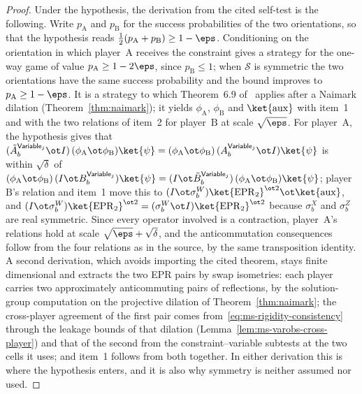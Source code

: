 \begin{proof}
	Under the hypothesis, the derivation from the cited self-test is the following. Write $p_{\mathrm A}$ and $p_{\mathrm B}$ for the success probabilities of the two orientations, so that the hypothesis reads $\tfrac12(p_{\mathrm A} + p_{\mathrm B}) \ge 1-\eps$. Conditioning on the orientation in which player~$\mathrm A$ receives the constraint gives a strategy for the one-way game of value $p_{\mathrm A} \ge 1-2\eps$, since $p_{\mathrm B} \le 1$; when $\mathcal S$ is symmetric the two orientations have the same success probability and the bound improves to $p_{\mathrm A} \ge 1-\eps$. It is a strategy to which Theorem~6.9 of~\cite{Coladangelo2017Robust} applies after a Naimark dilation (Theorem~\ref{thm:naimark}); it yields $\phi_{\mathrm A}$, $\phi_{\mathrm B}$ and $\ket{\mathrm{aux}}$ with item~1 and with the two relations of item~2 for player~$\mathrm B$ at scale $\sqrt\eps$. For player~$\mathrm A$, the hypothesis gives that $(\tilde A^{\mathsf{Variable}_j}_b \ot I)\,(\phi_{\mathrm A} \ot \phi_{\mathrm B})\ket{\psi} = (\phi_{\mathrm A} \ot \phi_{\mathrm B})\,(A^{\mathsf{Variable}_j}_b \ot I)\ket{\psi}$ is within $\sqrt\delta$ of $(\phi_{\mathrm A} \ot \phi_{\mathrm B})\,(I \ot B^{\mathsf{Variable}_j}_b)\ket{\psi} = (I \ot \tilde B^{\mathsf{Variable}_j}_b)\,(\phi_{\mathrm A} \ot \phi_{\mathrm B})\ket{\psi}$; player~$\mathrm B$'s relation and item~1 move this to $(I \ot \sigma^W_b)\ket{\mathrm{EPR}_2}^{\ot 2} \ot \ket{\mathrm{aux}}$, and $(I \ot \sigma^W_b)\ket{\mathrm{EPR}_2}^{\ot 2} = (\sigma^W_b \ot I)\ket{\mathrm{EPR}_2}^{\ot 2}$ because $\sigma^X_b$ and $\sigma^Z_b$ are real symmetric. Since every operator involved is a contraction, player~$\mathrm A$'s relations hold at scale $\sqrt\eps + \sqrt\delta$, and the anticommutation consequences follow from the four relations as in the source, by the same transposition identity. A second derivation, which avoids importing the cited theorem, stays finite dimensional and extracts the two EPR pairs by swap isometries: each player carries two approximately anticommuting pairs of reflections, by the solution-group computation on the projective dilation of Theorem~\ref{thm:naimark}; the cross-player agreement of the first pair comes from~\eqref{eq:ms-rigidity-consistency} through the leakage bounds of that dilation (Lemma~\ref{lem:ms-varobs-cross-player}) and that of the second from the constraint--variable subtests at the two cells it uses; and item~1 follows from both together. In either derivation this is where the hypothesis enters, and it is also why symmetry is neither assumed nor used.


\end{proof}
